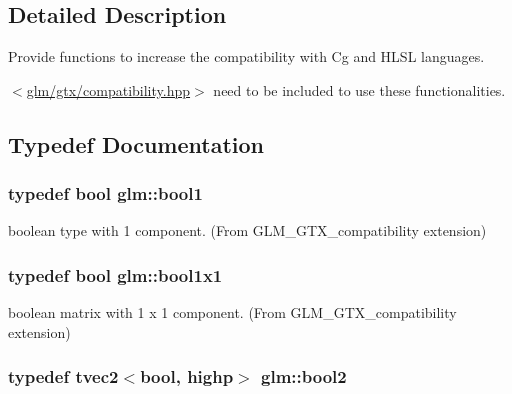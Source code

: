 \subsection{Detailed Description}
Provide functions to increase the compatibility with Cg and H\+L\+S\+L languages. 

$<$\hyperlink{compatibility_8hpp}{glm/gtx/compatibility.\+hpp}$>$ need to be included to use these functionalities. 

\subsection{Typedef Documentation}
\hypertarget{group__gtx__compatibility_gab65f19f5170f95a2f06d6aa6482c9405}{}
\subsubsection[{bool1}]{\setlength{\rightskip}{0pt plus 5cm}typedef bool {\bf glm\+::bool1}}\label{group__gtx__compatibility_gab65f19f5170f95a2f06d6aa6482c9405}


boolean type with 1 component. (From G\+L\+M\+\_\+\+G\+T\+X\+\_\+compatibility extension) 

\hypertarget{group__gtx__compatibility_ga98d9d3da22aebc872ba38ce5afa0eff7}{}
\subsubsection[{bool1x1}]{\setlength{\rightskip}{0pt plus 5cm}typedef bool {\bf glm\+::bool1x1}}\label{group__gtx__compatibility_ga98d9d3da22aebc872ba38ce5afa0eff7}


boolean matrix with 1 x 1 component. (From G\+L\+M\+\_\+\+G\+T\+X\+\_\+compatibility extension) 

\hypertarget{group__gtx__compatibility_gabe088d78d539d2a98a2a04ab798fec1a}{}
\subsubsection[{bool2}]{\setlength{\rightskip}{0pt plus 5cm}typedef tvec2$<$bool, highp$>$ {\bf glm\+::bool2}}\label{group__gtx__compatibility_gabe088d78d539d2a98a2a04ab798fec1a}


